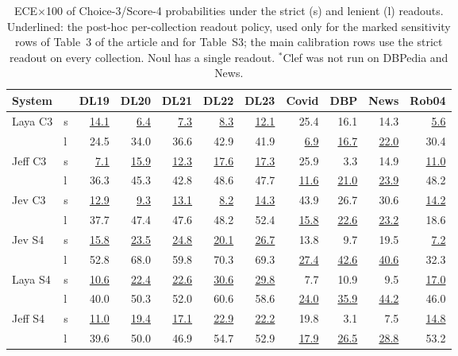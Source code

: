 \begin{table}[tp]
\centering
\scriptsize
\setlength{\tabcolsep}{2.2pt}
\caption{ECE$\times$100 of Choice-3/Score-4 probabilities under the strict (s) and lenient (l) readouts. Underlined: the post-hoc per-collection readout policy, used only for the marked sensitivity rows of Table~3 of the article and for Table~S3; the main calibration rows use the strict readout on every collection. Noul has a single readout. $^\ast$Clef was not run on DBPedia and News.}
\label{tab:readouts}
\begin{tabular}{llrrrrrrrrr}
\toprule
System & & DL19 & DL20 & DL21 & DL22 & DL23 & Covid & DBP & News & Rob04 \\
\midrule
Laya C3 & s & \underline{14.1} & \underline{6.4} & \underline{7.3} & \underline{8.3} & \underline{12.1} & 25.4 & 16.1 & 14.3 & \underline{5.6} \\
 & l & 24.5 & 34.0 & 36.6 & 42.9 & 41.9 & \underline{6.9} & \underline{16.7} & \underline{22.0} & 30.4 \\
Jeff C3 & s & \underline{7.1} & \underline{15.9} & \underline{12.3} & \underline{17.6} & \underline{17.3} & 25.9 & 3.3 & 14.9 & \underline{11.0} \\
 & l & 36.3 & 45.3 & 42.8 & 48.6 & 47.7 & \underline{11.6} & \underline{21.0} & \underline{23.9} & 48.2 \\
Jev C3 & s & \underline{12.9} & \underline{9.3} & \underline{13.1} & \underline{8.2} & \underline{14.3} & 43.9 & 26.7 & 30.6 & \underline{14.2} \\
 & l & 37.7 & 47.4 & 47.6 & 48.2 & 52.4 & \underline{15.8} & \underline{22.6} & \underline{23.2} & 18.6 \\
Jev S4 & s & \underline{15.8} & \underline{23.5} & \underline{24.8} & \underline{20.1} & \underline{26.7} & 13.8 & 9.7 & 19.5 & \underline{7.2} \\
 & l & 52.8 & 68.0 & 59.8 & 70.3 & 69.3 & \underline{27.4} & \underline{42.6} & \underline{40.6} & 32.3 \\
Laya S4 & s & \underline{10.6} & \underline{22.4} & \underline{22.6} & \underline{30.6} & \underline{29.8} & 7.7 & 10.9 & 9.5 & \underline{17.0} \\
 & l & 40.0 & 50.3 & 52.0 & 60.6 & 58.6 & \underline{24.0} & \underline{35.9} & \underline{44.2} & 46.0 \\
Jeff S4 & s & \underline{11.0} & \underline{19.4} & \underline{17.1} & \underline{22.9} & \underline{22.2} & 19.8 & 3.1 & 7.5 & \underline{14.8} \\
 & l & 39.6 & 50.0 & 46.9 & 54.7 & 52.9 & \underline{17.9} & \underline{26.5} & \underline{28.8} & 53.2 \\

\end{tabular}
\end{table}
